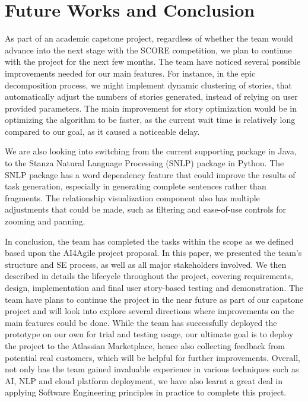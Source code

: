 \section{Future Works and Conclusion}
\label{conclusion}
As part of an academic capstone project, regardless of whether the team would advance into the next stage with the SCORE competition, we plan to continue with the project for the next few months. The team have noticed several possible improvements needed for our main features. For instance, in the epic decomposition process, we might implement dynamic clustering of stories, that automatically adjust the numbers of stories generated, instead of relying on user provided parameters. The main improvement for story optimization would be in optimizing the algorithm to be faster, as the current wait time is relatively long compared to our goal, as it caused a noticeable delay. 

We are also looking into switching from the current supporting package in Java, to the Stanza Natural Language Processing (SNLP) \cite{NLP1} package in Python. The SNLP package has a word dependency feature that could improve the results of task generation, especially in generating complete sentences rather than fragments. The relationship visualization component also has multiple adjustments that could be made, such as filtering and ease-of-use controls for zooming and panning. 

In conclusion, the team has completed the tasks within the scope as we defined based upon the AI4Agile project proposal. In this paper, we presented the team's structure and SE process, as well as all major stakeholders involved. We then described in details the lifecycle throughout the project, covering requirements, design, implementation and final user story-based testing and demonstration. The team have plans to continue the project in the near future as part of our capstone project and will look into explore several directions where improvements on the main features could be done. While the team has successfully deployed the prototype on our own for trial and testing usage, our ultimate goal is to deploy the project to the Atlassian Marketplace, hence also collecting feedback from potential real customers, which will be helpful for further improvements.  Overall, not only has the team gained invaluable experience  in various techniques such as AI, NLP and cloud platform deployment, we have also learnt a great deal in applying Software Engineering principles in practice to complete this project. 